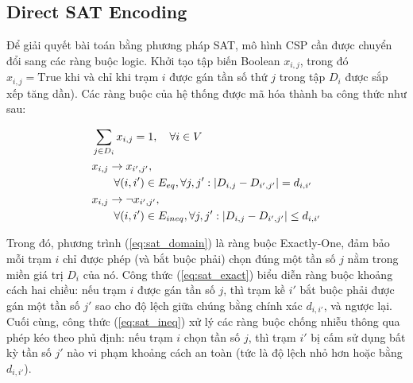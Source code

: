 \documentclass[letterpaper,journal]{IEEEtran}
\begin{document}


\subsection{Direct SAT Encoding}
Để giải quyết bài toán bằng phương pháp SAT, mô hình CSP cần được chuyển đổi sang các ràng buộc logic. Khởi tạo tập biến Boolean $x_{i,j}$, trong đó $x_{i,j} = \text{True}$ khi và chỉ khi trạm $i$ được gán tần số thứ $j$ trong tập $D_i$ được sắp xếp tăng dần). Các ràng buộc của hệ thống được mã hóa thành ba công thức như sau:

\begin{align}
    & \sum_{j \in D_i} x_{i,j} = 1, \quad \forall i \in V \label{eq:sat_domain} \\
    & x_{i,j} \rightarrow x_{i', j'}, \notag \\
    & \quad \quad \forall (i,i') \in E_{eq}, \forall j,j' : |D_{i,j} - D_{i',j'}| = d_{i,i'} \label{eq:sat_exact} \\
    & x_{i,j} \rightarrow \neg x_{i',j'}, \notag \\
    & \quad \quad \forall (i,i') \in E_{ineq}, \forall j,j' : |D_{i,j} - D_{i',j'}| \le d_{i,i'} \label{eq:sat_ineq}
\end{align}

Trong đó, phương trình (\ref{eq:sat_domain}) là ràng buộc Exactly-One, đảm bảo mỗi trạm $i$ chỉ được phép (và bắt buộc phải) chọn đúng một tần số $j$ nằm trong miền giá trị $D_i$ của nó. Công thức (\ref{eq:sat_exact}) biểu diễn ràng buộc khoảng cách hai chiều: nếu trạm $i$ được gán tần số $j$, thì trạm kề $i'$ bắt buộc phải được gán một tần số $j'$ sao cho độ lệch giữa chúng bằng chính xác $d_{i,i'}$, và ngược lại. Cuối cùng, công thức (\ref{eq:sat_ineq}) xử lý các ràng buộc chống nhiễu thông qua phép kéo theo phủ định: nếu trạm $i$ chọn tần số $j$, thì trạm $i'$ bị cấm sử dụng bất kỳ tần số $j'$ nào vi phạm khoảng cách an toàn (tức là độ lệch nhỏ hơn hoặc bằng $d_{i,i'}$).


\end{document}
